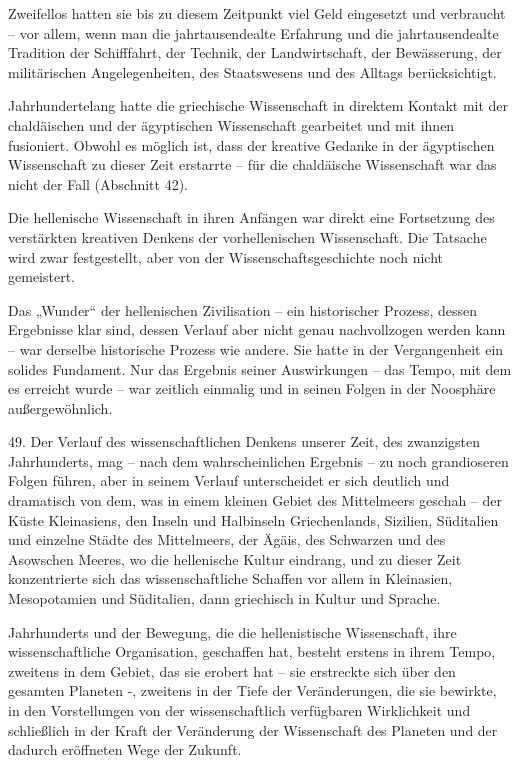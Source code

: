 \documentclass[11pt,a4paper]{book}
\begin{document}
Zweifellos hatten sie bis zu diesem Zeitpunkt viel Geld eingesetzt und verbraucht -- vor allem, wenn man die jahrtausendealte Erfahrung und die jahrtausendealte Tradition der Schifffahrt, der Technik, der Landwirtschaft, der Bewässerung, der militärischen Angelegenheiten, des Staatswesens und des Alltags berücksichtigt. 

Jahrhundertelang hatte die griechische Wissenschaft in direktem Kontakt mit der chaldäischen und der ägyptischen Wissenschaft gearbeitet und mit ihnen fusioniert. Obwohl es möglich ist, dass der kreative Gedanke in der ägyptischen Wissenschaft zu dieser Zeit erstarrte -- für die chaldäische Wissenschaft war das nicht der Fall (Abschnitt 42). 

Die hellenische Wissenschaft in ihren Anfängen war direkt eine Fortsetzung des verstärkten kreativen Denkens der vorhellenischen Wissenschaft. Die Tatsache wird zwar festgestellt, aber von der Wissenschaftsgeschichte noch nicht gemeistert. 

Das „Wunder“ der hellenischen Zivilisation -- ein historischer Prozess, dessen Ergebnisse klar sind, dessen Verlauf aber nicht genau nachvollzogen werden kann -- war derselbe historische Prozess wie andere. Sie hatte in der Vergangenheit ein solides Fundament. Nur das Ergebnis seiner Auswirkungen -- das Tempo, mit dem es erreicht wurde -- war zeitlich einmalig und in seinen Folgen in der Noosphäre außergewöhnlich. 

49. Der Verlauf des wissenschaftlichen Denkens unserer Zeit, des zwanzigsten Jahrhunderts, mag -- nach dem wahrscheinlichen Ergebnis -- zu noch grandioseren Folgen führen, aber in seinem Verlauf unterscheidet er sich deutlich und dramatisch von dem, was in einem kleinen Gebiet des Mittelmeers geschah -- der Küste Kleinasiens, den Inseln und Halbinseln Griechenlands, Sizilien, Süditalien und einzelne Städte des Mittelmeers, der Ägäis, des Schwarzen und des Asowschen Meeres, wo die hellenische Kultur eindrang, und zu dieser Zeit konzentrierte sich das wissenschaftliche Schaffen vor allem in Kleinasien, Mesopotamien und Süditalien, dann griechisch in Kultur und Sprache.

Jahrhunderts und der Bewegung, die die hellenistische Wissenschaft, ihre wissenschaftliche Organisation, geschaffen hat, besteht erstens in ihrem Tempo, zweitens in dem Gebiet, das sie erobert hat -- sie erstreckte sich über den gesamten Planeten -, zweitens in der Tiefe der Veränderungen, die sie bewirkte, in den Vorstellungen von der wissenschaftlich verfügbaren Wirklichkeit und schließlich in der Kraft der Veränderung der Wissenschaft des Planeten und der dadurch eröffneten Wege der Zukunft. 
\end{document}
